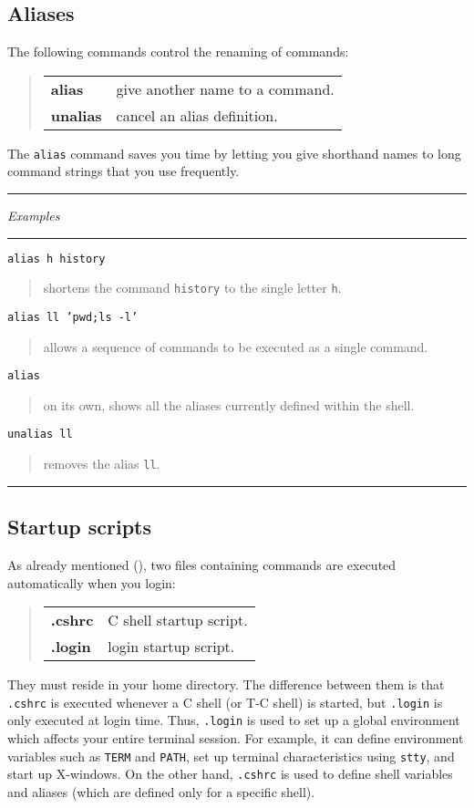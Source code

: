 \documentclass[twoside,11pt,nolof]{starlink}
\providecommand{\example}[2]{\goodbreak
                         \texttt{#1}
                         \vspace*{-4mm}
                         \begin{quote}
                           {\small #2}
                         \end{quote}
                        }
\providecommand{\exbegin}{\begin{center}
                      \rule{18mm}{0.3mm}
                      \emph{Examples}
                      \rule{18mm}{0.3mm}
                      \end{center}
                     }
\providecommand{\exend}{\begin{center}
                    \rule{50mm}{0.3mm}
                    \end{center}
                   }
\begin{document}
\subsection{Aliases\label{alias}}

The following commands control the renaming of commands:
\begin{quote}
\begin{tabular}{lp{67mm}}

\textbf{alias}   & give another name to a command.\\
\textbf{unalias} & cancel an alias definition.

\end{tabular}
\end{quote}

The \texttt{alias} command saves you time by letting you give shorthand names to
long command strings that you use frequently.

\goodbreak

\exbegin

\example{alias h history}
{shortens the command \texttt{history} to the single letter \texttt{h}.}

\example{alias ll 'pwd;ls -l'}
{allows a sequence of commands to be executed as a single command.}

\example{alias}
{on its own, shows all the aliases currently defined within the shell.}

\example{unalias ll}
{removes the alias \texttt{ll}.}

\exend

\subsection{Startup scripts\label{ss1}}

As already mentioned (),
two files containing commands are executed automatically when you login:
\begin{quote}
\begin{tabular}{lp{67mm}}

\textbf{.cshrc}  & C shell startup script.\\
\textbf{.login}  & login startup script.

\end{tabular}
\end{quote}

They must reside in your home directory.
The difference between them is that \texttt{.cshrc} is executed whenever a C shell
(or T-C shell) is started, but \texttt{.login} is only executed at login time.
Thus, \texttt{.login} is used to set up a global environment which affects your
entire terminal session.
For example, it can define environment variables such as \texttt{TERM} and
\texttt{PATH}, set up terminal characteristics using \texttt{stty}, and start up
X-windows.
On the other hand, \texttt{.cshrc} is used to define shell variables and aliases
(which are defined only for a specific shell).
\end{document}
